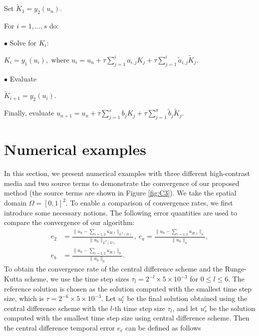\documentclass[preprint,12pt]{elsarticle}
\begin{document}
Set $\tilde{K}_1=y_2(u_n)$.

For $i=1,\dots,s$ do:

$\bullet$ Solve for $K_i$:

$K_i=y_1(u_i),$ where $u_i=u_n+\tau\sum_{j=1}^{i}a_{i,j}K_j+\tau\sum_{j=1}^{i}\tilde{a}_{i,j}\tilde{K}_j$.

$\bullet$ Evaluate

$\tilde{K}_{i+1}=y_2(u_i)$.

Finally, evaluate $u_{n+1}=u_n+\tau\sum_{j=1}^sb_jK_j+\tau\sum_{j=1}^{\sigma}\tilde{b}_j\tilde{K}_j.$

 
\section{Numerical examples}\label{006}
 In this section, we present numerical examples with three different high-contrast media and two source terms to demonstrate the convergence of our proposed method (the source terms are shown in Figure \ref{fig:C3}).
We take the spatial domain $\Omega=[0,1]^2$. To enable a comparison of convergence rates, we first introduce some necessary notions.
The following error quantities are used to compare the convergence of our algorithm:
\begin{equation}\label{n1}
\begin{aligned}
e_2&=\frac{\|u_h-\sum_{i=1,2}u_{H,i}\|_{L^2(\Omega)}}{\|u_h\|_{L^2(\Omega)}},~e_a=\frac{\|u_h-\sum_{i=1,2}u_{H,i}\|_{a}}{\|u_h\|_{a}},\\
e_b&=\frac{\|u_h-\sum_{i=1,2}u_{H,i}\|_{b}}{\|u_h\|_{b}}.
\end{aligned}
\end{equation}
To obtain the convergence rate of the central difference scheme and the Runge-Kutta scheme, we use the time step sizes $\tau_l= 2^{-l}\times5\times10^{-3}$ for $0\leq l\leq6$. The reference solution is chosen as the solution computed with the smallest time step size, which is $\tau=2^{-6}\times5\times10^{-3}$. Let $u^{c}_{l}$ be the final solution obtained using the central difference scheme with the $l$-th time step size $\tau_l$, and let $u^{c}_{s}$ be the solution computed with the smallest time step size  using central difference scheme. Then the central difference temporal error $e_c$ can be defined as follows
\end{document}

